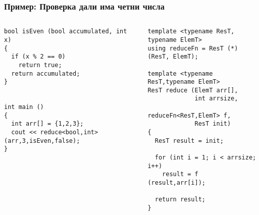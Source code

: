\documentclass{beamer}
\begin{document}
\begin{frame}[fragile]
\frametitle{Пример: Проверка дали има четни числа}


\begin{columns}[t]
  \begin{column}{0.55\textwidth}

\begin{flushleft}
\begin{lstlisting}
bool isEven (bool accumulated, int x)
{
  if (x % 2 == 0)
    return true;
  return accumulated;
}


int main ()
{
  int arr[] = {1,2,3};
  cout << reduce<bool,int> (arr,3,isEven,false);
}

\end{lstlisting}  
\end{flushleft}
  \end{column}
  \begin{column}{0.45\textwidth}
\begin{flushleft}
\vspace{-30px}
\begin{lstlisting}
template <typename ResT, typename ElemT>
using reduceFn = ResT (*) (ResT, ElemT);

template <typename ResT,typename ElemT>
ResT reduce (ElemT arr[], 
             int arrsize, 
             reduceFn<ResT,ElemT> f, 
             ResT init)
{
  ResT result = init;

  for (int i = 1; i < arrsize; i++)
    result = f (result,arr[i]);

  return result;
}
\end{lstlisting}  
\end{flushleft}

  \end{column}
\end{columns}


\end{frame}
\end{document}
